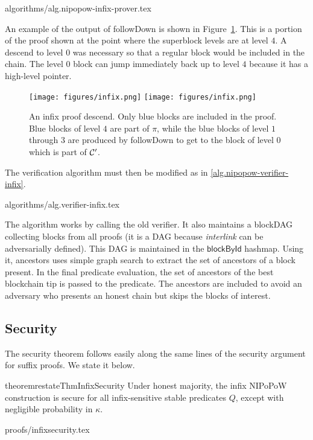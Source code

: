 {algorithms/alg.nipopow-infix-prover.tex}

An example of the output of followDown is shown in Figure~\ref{fig.infix}. This
is a portion of the proof shown at the point where the superblock levels are at
level $4$. A descend to level $0$ was necessary so that a regular block would be
included in the chain. The level $0$ block can jump immediately back up to level
$4$ because it has a high-level pointer.

\begin{figure}[h]
    \caption{An infix proof descend. Only blue blocks are included in the proof.
    Blue blocks of level $4$ are part of $\pi$, while the blue blocks of level
    $1$ through $3$ are produced by followDown to get to the block of level $0$
    which is part of $\mathcal{C}'$.}
    \centering
    \iftwocolumn
        \texttt{[image: figures/infix.png]}
    \else
        \texttt{[image: figures/infix.png]}
    \fi
    \label{fig.infix}
\end{figure}

The verification algorithm must then be modified as in
\ref{alg.nipopow-verifier-infix}.

{algorithms/alg.verifier-infix.tex}

The algorithm works by calling the old verifier. It also maintains a blockDAG
collecting blocks from all proofs (it is a DAG because \textit{interlink} can be
adversarially defined). This DAG is maintained in the $\textsf{blockById}$
hashmap. Using it, \textsf{ancestors} uses simple graph search to extract the
set of ancestors of a block present. In the final predicate evaluation, the set
of ancestors of the best blockchain tip is passed to the predicate. The
ancestors are included to avoid an adversary who presents an honest chain but
skips the blocks of interest.

\subsection{Security}
The security theorem follows easily along
the same lines of the security argument for suffix proofs. We state it below.
\begin{restatable}{theorem}{restateThmInfixSecurity}
\label{thm.infix-security}
Under honest majority, the infix NIPoPoW construction is secure for all
infix-sensitive stable predicates $Q$, except with negligible probability in
$\kappa$.
\end{restatable}
{proofs/infixsecurity.tex}

